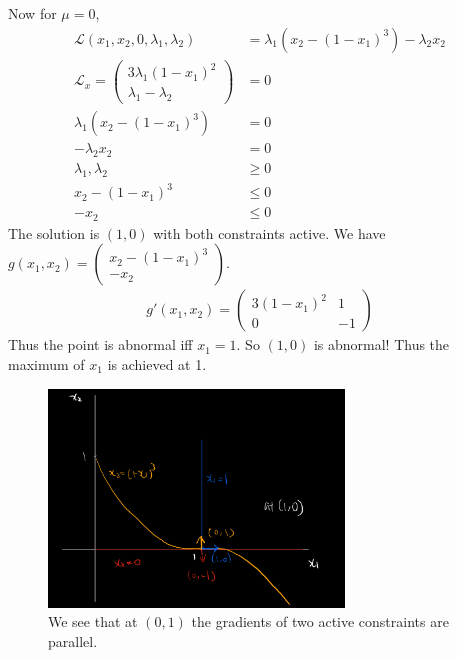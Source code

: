 \documentclass[12pt]{article}
\begin{document}
\begin{problem}[3]
Now for $ \mu=0$,
\begin{align*}
	\mathscr{L}(x_1,x_2,0,\lambda_1,\lambda_2) &= \lambda_1(x_2-(1-x_1)^3)-\lambda_2 x_2\\
	\mathscr{L}_x = \begin{pmatrix} 3\lambda_1(1-x_1)^2\\ \lambda_1-\lambda_2 \end{pmatrix} &=0 \\
	\lambda_1(x_2-(1-x_1)^3) &= 0 \\
	-\lambda_2 x_2 &= 0 \\
	\lambda_1,\lambda_2 &\geq 0\\
	x_2-(1-x_1)^3 &\leq 0\\
	-x_2 &\leq 0 
\end{align*}
The solution is $ (1,0)$ with both constraints active. We have $ g(x_1,x_2) = \begin{pmatrix} x_2 - (1-x_1)^3\\-x_2 \end{pmatrix} $.
\begin{align*}
	g'(x_1,x_2) = \begin{pmatrix} 3(1-x_1)^2&1\\0&-1 \end{pmatrix} 
\end{align*}
Thus the point is abnormal iff $ x_1=1$. So $ (1,0)$ is abnormal! Thus the maximum of  $ x_1$ is achieved at 1.
~\begin{figure}[H]
	\centering
	\includegraphics[width=0.7\textwidth]{./figures/gradient.png}
	\caption{We see that at $ (0,1)$ the gradients of two active constraints are parallel.}
\end{figure}
\end{problem}
\end{document}
